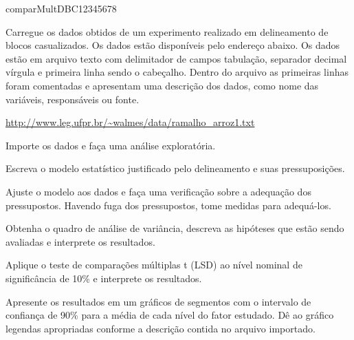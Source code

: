 \begin{defproblem}{comparMultDBC12345678}
  

  
\noindent Carregue os dados obtidos de um experimento realizado em
delineamento de blocos casualizados. Os dados estão disponíveis pelo
endereço abaixo. Os dados estão em arquivo texto com delimitador de
campos tabulação, separador decimal vírgula e primeira linha sendo o
cabeçalho. Dentro do arquivo as primeiras linhas foram comentadas e
apresentam uma descrição dos dados, como nome das variáveis,
responsáveis ou fonte.

\begin{center}
  \url{http://www.leg.ufpr.br/~walmes/data/ramalho\_arroz1.txt}
\end{center}

\begin{compactenum}
  \item Importe os dados e faça uma análise exploratória.
  \item Escreva o modelo estatístico justificado pelo delineamento e
    suas pressuposições.
  \item Ajuste o modelo aos dados e faça uma verificação sobre a
    adequação dos pressupostos. Havendo fuga dos pressupostos, tome
    medidas para adequá-los.
  \item Obtenha o quadro de análise de variância, descreva as hipóteses
    que estão sendo avaliadas e interprete os resultados.
  \item Aplique o teste de comparações múltiplas t (LSD) ao nível
    nominal de significância de 10\% e interprete os
    resultados.
  \item Apresente os resultados em um gráficos de segmentos com o
    intervalo de confiança de 90\% para a média de cada
    nível do fator estudado. Dê ao gráfico legendas apropriadas conforme
    a descrição contida no arquivo importado.
\end{compactenum}

\begin{onlysolution}
\begin{solution}
  \textcolor{A fazer.}
\end{solution}
\end{onlysolution}

\end{defproblem}
